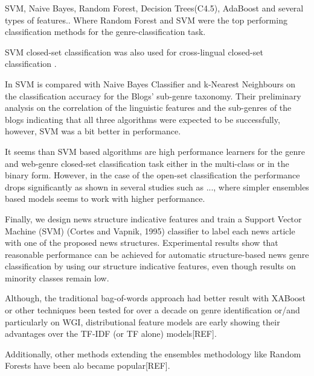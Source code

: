 SVM, Naive Bayes, Random Forest, Decision Trees(C4.5), AdaBoost and several types of features.\parencite{lee2017text}. Where Random Forest and SVM were the top performing classification methods for the genre-classification task.

SVM closed-set classification was also used for cross-lingual closed-set classification \parencite{nguyen2019cross}. 

In \parencite{virik2017blog} SVM is compared with Naive Bayes Classifier and k-Nearest Neighbours on the classification accuracy for the Blogs' sub-genre taxonomy. Their preliminary analysis on the correlation of the linguistic features and the sub-genres of the blogs indicating that all three algorithms were expected to be successfully, however, SVM was a bit better in performance. 

It seems than SVM based algorithms are high performance learners for the genre and web-genre closed-set classification task either in the multi-class or in the binary form. However, in the case of the open-set classification the performance drops significantly as shown in several studies such as ..., where simpler ensembles based models seems to work with higher performance. 

Finally, we design news structure indicative features and train a Support Vector Machine (SVM) (Cortes and Vapnik, 1995) classifier to label each news article with one of the proposed news structures. Experimental results show that reasonable performance can be achieved for automatic structure-based news genre classification by using our structure indicative features, even though results on minority classes remain low.

Although, the traditional bag-of-words approach had better result with XABoost or other techniques been tested for over a decade on genre identification or/and particularly on WGI, distributional feature models are early showing their advantages over the TF-IDF (or TF alone) models[REF].

Additionally, other methods extending the ensembles methodology like Random Forests have been alo became popular[REF].

